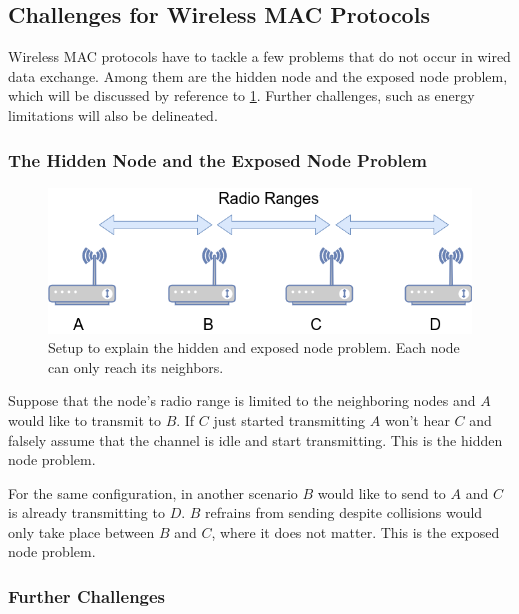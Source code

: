 \subsection{Challenges for Wireless MAC Protocols}

Wireless MAC protocols have to tackle a few problems that do not occur in wired data exchange. Among them are the hidden node and the exposed node problem, which will be discussed by reference to \ref{fig:hidden_exposed_node_problem}. Further challenges, such as energy limitations will also be delineated.

\subsubsection{The Hidden Node and the Exposed Node Problem}

\begin{figure}[tb]
	\label{fig:hidden_exposed_node_problem}
	\begin{center}
		\includegraphics[width=12cm]{pictures/hidden_exposed_node_problem}
	\end{center}
	\caption{Setup to explain the hidden and exposed node problem. Each node can only reach its neighbors.}
\end{figure}

Suppose that the node's radio range is limited to the neighboring nodes and $A$ would like to transmit to $B$. If $C$ just started transmitting $A$ won't hear $C$ and falsely assume that the channel is idle and start transmitting. This is the hidden node problem.

For the same configuration, in another scenario $B$ would like to send to $A$ and $C$ is already transmitting to $D$. $B$ refrains from sending despite collisions would only take place between $B$ and $C$, where it does not matter. This is the exposed node problem. 

\subsubsection{Further Challenges}

